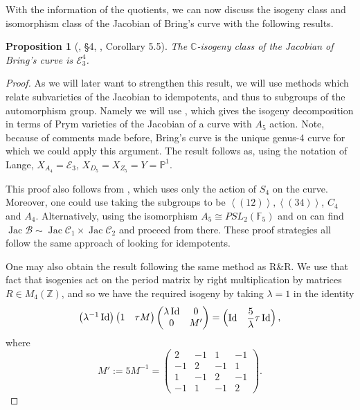 \documentclass{amsart}
\newtheorem{prop}[theorem]{Proposition}
\DeclareMathOperator{\id}{Id}
\DeclareMathOperator{\Jac}{Jac}
\newcommand{\pangle}[1]{\left\langle #1 \right\rangle}
\begin{document}
With the information of the quotients, we can now discuss the isogeny class and isomorphism class of the Jacobian of Bring's curve with the following results. 

\begin{prop}[\cite{Riera1992}, \S4, \cite{Weber2005}, Corollary 5.5]\label{prop: CC-isogeny class of Bring's Jacobian}
The $\mathbb{C}$-isogeny class of the Jacobian of Bring's curve is $\mathcal{E}_3^4$.
\end{prop}
\begin{proof}
As we will later want to strengthen this result, we will use methods which relate subvarieties of the Jacobian to idempotents, and thus to subgroups of the automorphism group. Namely we will use \cite[\S4.2]{Lange2001}, which gives the isogeny decomposition in terms of Prym varieties of the Jacobian of a curve with $A_5$ action. Note, because of comments made before, Bring's curve is the unique genus-4 curve for which we could apply this argument. The result follows as, using the notation of Lange, $X_{A_4} = \mathcal{E}_3$, $X_{D_5} = X_{Z_5} = Y = \mathbb{P}^1$. 


This proof also follows from \cite[Proposition 5.1]{Lange2001}, which uses only the action of $S_4$ on the curve. Moreover, one could use \cite[Theorem C]{Kani1989} taking the subgroups to be $\pangle{(12)}, \pangle{(34)}$, $C_4$ and $A_4$. Alternatively, using the isomorphism $A_5 \cong PSL_2(\mathbb{F}_5)$ and \cite[Example 2]{Kani1989} on can find $\Jac \mathcal{B} \sim \Jac \mathcal{C}_1 \times \Jac\mathcal{C}_2$ and proceed from there. These proof strategies all follow the same approach of looking for idempotents.


One may also obtain the result following the same method as R\&R. We use that fact that isogenies act on the period matrix by right multiplication by matrices $R \in M_{4}(\mathbb{Z})$, and so we have the required isogeny by taking $\lambda=1$ in the identity
$$
\begin{pmatrix} \lambda\sp{-1}\id \end{pmatrix} \begin{pmatrix} 1 & \tau M \end{pmatrix}  \begin{pmatrix} \lambda\id & 0 \\ 0 & M^\prime \end{pmatrix} = \begin{pmatrix}\id & \dfrac{5}{\lambda}\tau \id \end{pmatrix}  ,
$$
where
$$
M':= 5 M^{-1} = \begin{pmatrix} 2 & -1 & 1 & -1 \\ -1 & 2 & -1 & 1 \\ 1 & -1 & 2 & -1 \\ -1 & 1 & -1 & 2 \end{pmatrix}  .
$$
\end{proof}
\end{document}
